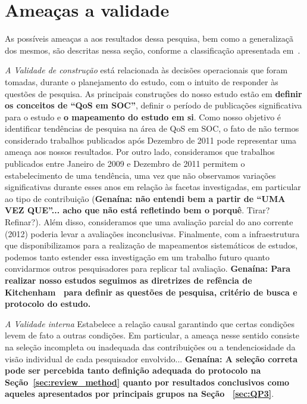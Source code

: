 \section{Amea\c cas a validade}

As poss\'{i}veis amea\c{c}as a aos resultados dessa pesquisa, bem como a generaliza\c c\~{a} dos mesmos, s\~{a}o descritas nessa se\c c\~{a}o, conforme a classifica\c c\~{a}o apresentada em~\cite{leedy1980practical}. 

\noindent
\emph{A Validade de constru\c c\~{a}o} est\'{a} relacionada
\`{a}s decis\~{o}es operacionais que foram tomadas, durante o
planejamento do estudo, com o intuito de responder \`{a}s quest\~{o}es de
pesquisa. As principais constru\c{c}\~{o}es do nosso estudo est\~{a}o em \textbf{definir os conceitos de ``QoS em SOC''}, definir o per\'{i}odo de publica\c{c}\~{o}es significativa para o estudo e \textbf{o mapeamento do estudo em si}. Como nosso objetivo \'{e} identificar tend\^{e}ncias de pesquisa na \'{a}rea de QoS em SOC, o fato de n\~{a}o termos considerado trabalhos publicados ap\'{o}s Dezembro de 2011 pode representar uma amea\c ca aos nossos resultados. Por outro lado, consideramos que trabalhos publicados entre Janeiro de 2009 e Dezembro de 2011 permitem o estabelecimento de uma tend\^{e}ncia, uma vez que n\~{a}o observamos varia\c c\~{o}es significativas durante esses anos em rela\c c\~{a}o \`{a}s facetas investigadas, em particular ao tipo de contribui\c c\~{a}o (\textbf{Genaína: não entendi bem a partir de ``UMA VEZ QUE''... acho que não está refletindo bem o porquê}. Tirar? Refinar?). Al\'{e}m disso, consideramos que uma avalia\c c\~{a}o parcial do ano corrente (2012) poderia levar a avalia\c{c}\~{o}es
inconclusivas. Finalmente, com a infraestrutura que disponibilizamos para a realiza\c
c\~{a}o de mapeamentos sistem\'{a}ticos de estudos, podemos tanto estender 
essa investiga\c c\~{a}o em um trabalho futuro quanto convidarmos outros 
pesquisadores para replicar tal avalia\c c\~{a}o. \textbf{Gena\'{i}na: Para realizar nosso estudos seguimos as diretrizes de ref\^{e}ncia de Kitchenham~\cite{kitchenham:techReport2007} para definir as quest\~{o}es de pesquisa, crit\'{e}rio de busca e protocolo do estudo.}

\noindent
\emph{A Validade interna}
Estabelece a rela\c{c}\~{a}o causal garantindo que certas condi\c{c}\~{o}es levem de fato a outras condi\c{c}\~{o}es. Em particular, a ameaça nesse sentido consiste na seleção incompleta ou inadequada das contribuições ou a tendenciosidade da visão individual de cada pesquisador envolvido... \textbf{Genaína: A seleção correta pode ser percebida tanto definição adequada do protocolo na Seção~\ref{sec:review_method} quanto por resultados conclusivos como aqueles apresentados por principais grupos na Se\c{c}\~{a}o ~\ref{sec:QP3}}.

